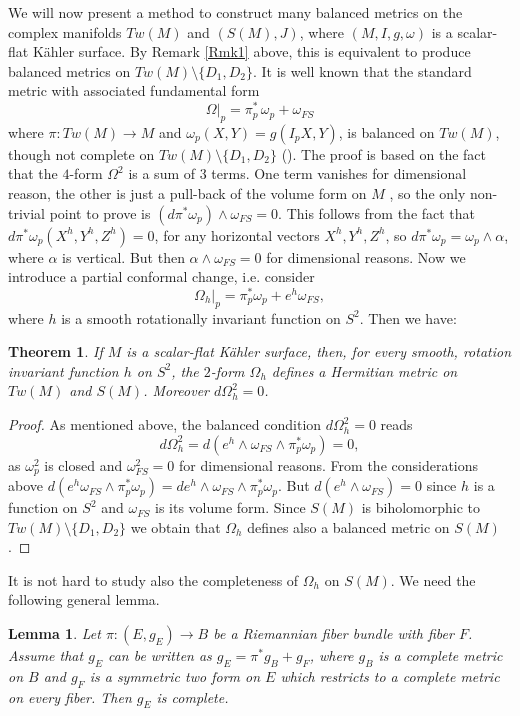 \documentclass[11pt]{amsart}
\theoremstyle{definition}
\theoremstyle{plain}
\newtheorem{Teorema}[Def]{Theorem}
\theoremstyle{definition}
\theoremstyle{plain}
\newtheorem{Lemma}[Def]{Lemma}
\theoremstyle{remark}
\theoremstyle{plain}
\begin{document}
We will now present a method to construct many balanced metrics on the complex manifolds $Tw(M)$ and $(S(M), J)$,  where  $(M, I, g, \omega)$ is a scalar-flat K\"ahler  surface.  By Remark \ref{Rmk1} above,  this is equivalent to produce balanced metrics on $Tw(M)\setminus \{D_1, D_2\}$. It is well known that the standard metric  with associated fundamental form   $$\Omega|_p=  \pi^*_p  \, \omega_p  +\omega_{FS}$$  where $\pi: Tw (M) \rightarrow M$ and  $\omega_p (X,Y) = g(I_pX,Y)$, is balanced on $Tw(M)$, though not complete on $Tw(M)\setminus \{D_1, D_2\}$ (\cite{Michelsohn, Oleg}).
The proof is based on the fact that  the $4$-form $\Omega^2$ is a sum of 3 terms. One term vanishes for dimensional reason, the other is just a pull-back of the volume form on $M$ , so the only non-trivial point to prove is $(d \pi^*\omega_p) \wedge \omega_{FS} = 0$. This follows from the fact that $d\pi^*\omega_p(X^h, Y^h, Z^h) = 0$,  for any horizontal vectors $X^h,Y^h,Z^h$, so $d\pi^*\omega_p = \omega_p\wedge \alpha$,  where $\alpha$ is vertical. But then $\alpha\wedge\omega_{FS} = 0$ for dimensional reasons.
 Now we introduce a partial conformal change, i.e. consider $${\Omega_{h}|}_p= \pi^*_p\omega_p  +e^h\omega_{FS},$$
where $h$ is a  smooth rotationally  invariant function on $S^2$. Then we have:
\begin{Teorema}\label{balancedness}
If $M$ is a scalar-flat K\"ahler surface, then, for  every smooth,  rotation invariant function $h$ on $S^2$, the $2$-form  $\Omega_h$  defines a  Hermitian metric on $Tw(M)$ and $S(M)$.  Moreover $d\Omega_h^2 =0$.
\end{Teorema}
\begin{proof}

As mentioned above, the  balanced condition $d\Omega_h^2=0$ reads 
\[
d\Omega_h^2=d(e^h \wedge \omega_{FS} \wedge \pi^*_p \omega_p) =0, 
\]
as $\omega^2_p$ is closed and $\omega_{FS}^2=0$ for dimensional reasons. From the considerations above $d(e^h \omega_{FS} \wedge \pi^*_p \omega_p) = de^h \wedge \omega_{FS} \wedge \pi^*_p\omega_p$.  But $d(e^h \wedge \omega_{FS} )= 0$ since $h$ is a function on $S^2$ and $\omega_{FS}$ is its volume form.  Since $S(M)$ is biholomorphic to $Tw(M)\setminus \{D_1,D_2\}$ we obtain that $\Omega_{h}$ defines also  a balanced metric on $S(M)$.
\end{proof}
It is not hard to study also the completeness of $\Omega_h$ on $S(M)$. We need the following general lemma.
\begin{Lemma}
        Let $\pi: (E,g_E)\to B$ be a Riemannian fiber bundle with fiber $F$. Assume that $g_E$ can be written as $g_E=\pi^* g_B+g_F$, where $g_B$ is a complete metric on $B$ and $g_F $ is a symmetric two form on $E$ which restricts to a complete metric on every fiber. Then $g_E$ is complete.
    \end{Lemma}
\end{document}
